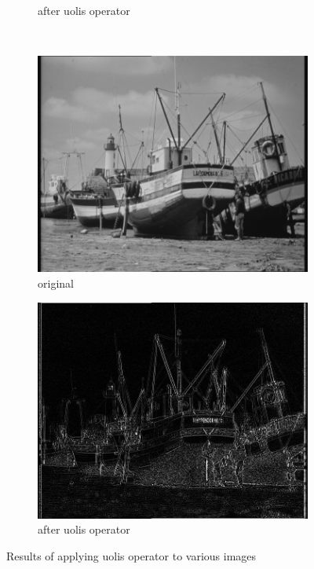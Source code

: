 \documentclass[12pt]{article}
\begin{document}
\begin{figure}[H]
\begin{subfigure}[t]{\subfiguresize}
        \caption{after uolis operator}
    \end{subfigure}
    \\
    \begin{subfigure}[t]{\subfiguresize}
        \includegraphics[width=\textwidth]{boats.png}
        \caption{original}
    \end{subfigure}
    \hspace{1em}
    \begin{subfigure}[t]{\subfiguresize}
        \includegraphics[width=\textwidth]{boats_uolis.png}
        \caption{after uolis operator}
    \end{subfigure}
    \caption{Results of applying uolis operator to various images}
    \label{fig:uolis-more}
\end{figure}
\end{document}
